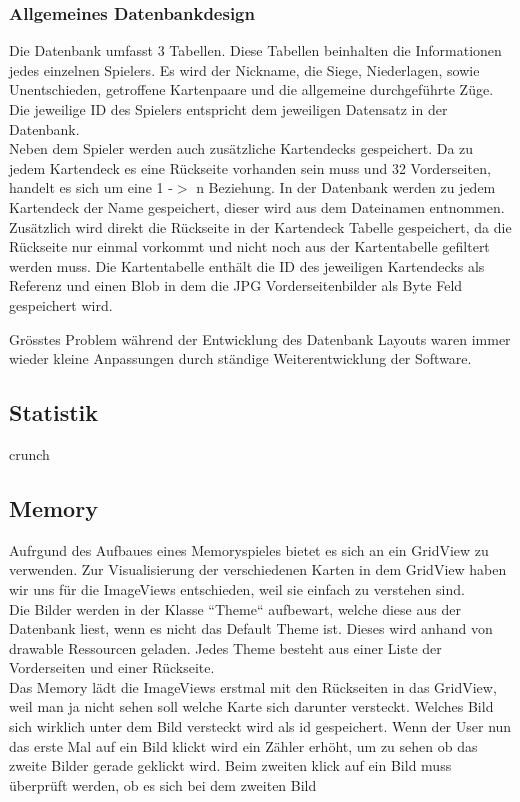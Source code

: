 \documentclass[11pt,a4paper]{article}
\begin{document}
\subsubsection{Allgemeines Datenbankdesign}
Die Datenbank umfasst 3 Tabellen. Diese Tabellen beinhalten die Informationen jedes einzelnen Spielers. Es wird der Nickname, die Siege, Niederlagen, sowie Unentschieden, getroffene Kartenpaare und die allgemeine durchgeführte Züge. Die jeweilige ID des Spielers entspricht dem jeweiligen Datensatz in der Datenbank.\\
Neben dem Spieler werden auch zusätzliche Kartendecks gespeichert. Da zu jedem Kartendeck es eine Rückseite vorhanden sein muss und 32 Vorderseiten, handelt es sich um eine 1 -$>$ n Beziehung. In der Datenbank werden zu jedem Kartendeck der Name gespeichert, dieser wird aus dem Dateinamen entnommen. Zusätzlich wird direkt die Rückseite in der Kartendeck Tabelle gespeichert, da die Rückseite nur einmal vorkommt und nicht noch aus der Kartentabelle gefiltert werden muss. Die Kartentabelle enthält die ID des jeweiligen Kartendecks als Referenz und einen Blob in dem die JPG Vorderseitenbilder als Byte Feld gespeichert wird.

Grösstes Problem während der Entwicklung des Datenbank Layouts waren immer wieder kleine Anpassungen durch ständige Weiterentwicklung der Software.

\subsection{Statistik}
crunch
\subsection{Memory}
Aufrgund des Aufbaues eines Memoryspieles bietet es sich an ein GridView zu verwenden. Zur Visualisierung der verschiedenen Karten in dem GridView haben wir uns für die ImageViews entschieden, weil sie einfach zu verstehen sind. \\

Die Bilder werden in der Klasse ``Theme`` aufbewart, welche diese aus der Datenbank liest, wenn es nicht das Default Theme ist. Dieses wird anhand von drawable Ressourcen geladen. Jedes Theme besteht aus einer Liste der Vorderseiten und einer Rückseite. \\

Das Memory lädt die ImageViews erstmal mit den Rückseiten in das GridView, weil man ja nicht sehen soll welche Karte sich darunter versteckt. Welches Bild sich wirklich unter dem Bild versteckt wird als id gespeichert. Wenn der User nun das erste Mal auf ein Bild klickt wird ein Zähler erhöht, um zu sehen ob das zweite Bilder gerade geklickt wird. Beim zweiten klick auf ein Bild  muss überprüft werden, ob es sich bei dem zweiten Bild
\end{document}
